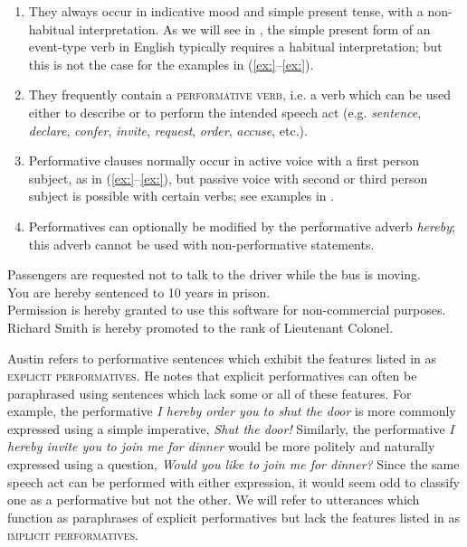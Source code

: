 \begin{enumerate}
\item They always occur in indicative mood and simple present tense, with a non-habitual interpretation. As we will see in , the simple present form of an event-type verb in English typically requires a habitual interpretation; but this is not the case for the examples in (\ref{ex:}--\ref{ex:}).
\item They frequently contain a \textsc{performative verb}, i.e. a verb which can be used either to describe or to perform the intended speech act (e.g. \textit{sentence}, \textit{declare}, \textit{confer}, \textit{invite}, \textit{request}, \textit{order}, \textit{accuse}, etc.).
\item Performative clauses normally occur in active voice with a first person subject, as in (\ref{ex:}--\ref{ex:}), but passive voice with second or third person subject is possible with certain verbs; see examples in .
\item Performatives can optionally be modified by the performative adverb \textit{hereby}; this adverb cannot be used with non-performative statements.
\end{enumerate}
\ea
\ea Passengers are requested not to talk to the driver while the bus is moving.\\
\ex You are hereby sentenced to 10 years in prison.\\
\ex Permission is hereby granted to use this software for non-commercial purposes.\\
\ex Richard Smith is hereby promoted to the rank of Lieutenant Colonel.
                       \z
\z


Austin refers to performative sentences which exhibit the features listed in  as \textsc{explicit performatives}. He notes that explicit performatives can often be paraphrased using sentences which lack some or all of these features. For example, the performative \textit{I hereby order you to shut the door} is more commonly expressed using a simple imperative, \textit{Shut the door!} Similarly, the performative \textit{I hereby invite you to join me for dinner} would be more politely and naturally expressed using a question, \textit{Would you like to join me for dinner?} Since the same speech act can be performed with either expression, it would seem odd to classify one as a performative but not the other. We will refer to utterances which function as paraphrases of explicit performatives but lack the features listed in  as \textsc{implicit performatives}.




